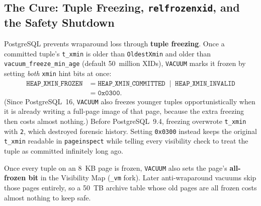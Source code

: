 \subsection{The Cure: Tuple Freezing, \texttt{relfrozenxid}, and the Safety Shutdown}

PostgreSQL prevents wraparound loss through \textbf{tuple freezing}. Once a committed tuple's \texttt{t\_xmin} is older than \texttt{OldestXmin} and older than \texttt{vacuum\_freeze\_min\_age} (default 50~million XIDs), \texttt{VACUUM} marks it frozen by setting \emph{both} \texttt{xmin} hint bits at once:
\begin{align*}
  \texttt{HEAP\_XMIN\_FROZEN} &= \texttt{HEAP\_XMIN\_COMMITTED} \;\mid\; \texttt{HEAP\_XMIN\_INVALID} \\
  &= \texttt{0x0300}.
\end{align*}
(Since PostgreSQL~16, \texttt{VACUUM} also freezes younger tuples opportunistically when it is already writing a full-page image of that page, because the extra freezing then costs almost nothing.) Before PostgreSQL~9.4, freezing overwrote \texttt{t\_xmin} with \texttt{2}, which destroyed forensic history. Setting \texttt{0x0300} instead keeps the original \texttt{t\_xmin} readable in \texttt{pageinspect} while telling every visibility check to treat the tuple as committed infinitely long ago.

Once every tuple on an 8~KB page is frozen, \texttt{VACUUM} also sets the page's \textbf{all-frozen bit} in the Visibility Map (\texttt{\_vm} fork). Later anti-wraparound vacuums skip those pages entirely, so a 50~TB archive table whose old pages are all frozen costs almost nothing to keep safe.

